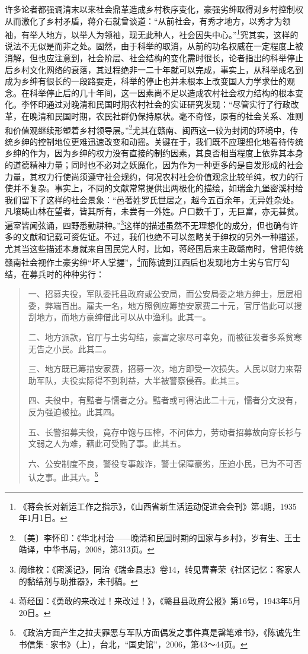 许多论者都强调清末以来社会鼎革造成乡村秩序变化，豪强劣绅取得对乡村控制权从而激化了乡村矛盾，蒋介石就曾谈道：“从前社会，有秀才地方，以秀才为领袖，有举人地方，以举人为领袖，现无此种人，社会因失中心。”\footnote{《蒋会长对新运工作之指示》，《山西省新生活运动促进会会刊》第4期，1935年1月1日。}究其实，这样的说法不无似是而非之处。固然，由于科举的取消，从前的功名权威在一定程度上被消解，但也应注意到，社会阶层、社会结构的变化需时很长，论者指出的科举停止后乡村文化网络的衰落，其过程绝非一二十年就可以完成，事实上，从科举成名到成为乡绅有很长的一段路要走，科举的停止也并未根本上改变国人力学求仕的观念。在科举停止后的几十年间，这一因素尚不足以造成农村社会权力结构的根本变化。李怀印通过对晚清和民国时期农村社会的实证研究发现：“尽管实行了行政改革，在晚清和民国时期，农民社群仍保持原状。毫不奇怪，原有的社会关系、准则和价值观继续形塑着乡村领导层。”\footnote{〔美〕李怀印：《华北村治——晚清和民国时期的国家与乡村》，岁有生、王士皓译，中华书局，2008，第313页。}尤其在赣南、闽西这一较为封闭的环境中，传统乡绅的控制地位更难迅速改变和动摇。关键在于，我们既不应理想化地看待传统乡绅的作为，因为乡绅的权力没有直接的制约因素，其良否相当程度上依靠其本身的道德精神力量；同时也不必对之妖魔化，因为作为一种更多的是自发形成的社会力量，其权力行使尚须遵守社会规约，何况农村社会价值观念比较单纯，权力的行使并不复杂。事实上，不同的文献常常提供出两极化的描绘，如瑞金九堡密溪村给我们留下了这样的社会景象：“邑著姓罗氏世居之，越今五百余年，无异姓杂处。凡壤畴山林在望者，皆其所有，未尝有一外姓。户口数千丁，无巨富，亦无甚贫。遍室皆闻弦诵，四野悉勤耕种。”\footnote{阙维枚：《密溪记》，同治《瑞金县志》卷14，转见曹春荣《社区记忆：客家人的黏结剂与助推器》，未刊稿。}这样的描述虽然不无理想化的成分，但也确有许多的文献和记载可资佐证。不过，我们也绝不可以忽略关于绅权的另外一种描述，尤其当这些描述本身就来自国民党人时，比如，蒋经国后来主政赣南时，曾把传统赣南社会视作土豪劣绅“坏人掌握”，\footnote{蒋经国：《勇敢的来改过！来改过！》，《赣县县政府公报》第16号，1943年5月20日。}而陈诚到江西后也发现地方土劣与官厅勾结，在募兵时的种种劣行：

\begin{quote}

一、招募夫役，军队委托县政府或公安局，而公安局委之地方绅士，层层相委，弊端百出。雇夫一名，地方照例应筹垫安家费二十元，官厅借此可以搜刮地方，而地方豪绅借此可以从中渔利。此其一。

二、地方派款，官厅与土劣勾结，豪富之家尽可幸免，而被征发者多系贫寒无告之小民。此其二。

三、地方既已筹措安家费，招募一次，地方即受一次损失。人民以财力来帮助军队，夫役实际得不到利益，大半被警察侵吞。此其三。

四、夫役中，有黠者与懦者之分。黠者或可得沾此二十元，懦者分文没有，反为强迫被拉。此其四。

五、长警招募夫役，竟存中饱与压榨，不问体力，劳动者招募故向穿长衫与文弱之人为难，藉此可受贿了事。此其五。

六、公安制度不良，警役专事敲诈，警士保障豪劣，压迫小民，已为不可否认之事。此其六。\footnote{《政治方面产生之拉夫罪恶与军队方面偶发之事件真是罄笔难书》，《陈诚先生书信集·家书》（上），台北，“国史馆”，2006，第43～44页。}
\end{quote}


